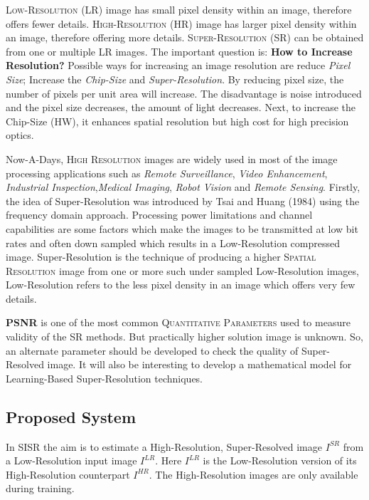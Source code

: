 \documentclass[12pt]{article}
\begin{document}
				\textsc{Low-Resolution} (LR) image has small pixel density within an image, therefore offers fewer details. \textsc{High-Resolution} (HR) image has larger pixel density within an image, therefore offering more details. \textsc{Super-Resolution} (SR) can be obtained from one or multiple LR images. The important question is: \textbf{How to Increase Resolution?} Possible ways for increasing an image resolution are reduce \textit{Pixel Size}; Increase the \textit{Chip-Size} and \textit{Super-Resolution}. By reducing pixel size, the number of pixels per unit area will increase. The disadvantage is noise introduced and the pixel size decreases, the amount of light decreases. Next, to increase the Chip-Size (HW), it enhances spatial resolution but high cost for high precision optics.
				
				Now-A-Days, \textsc{High Resolution} images are widely used in most of the image processing applications such as \textit{Remote Surveillance}, \textit{Video Enhancement}, \textit{Industrial Inspection},\textit{Medical Imaging}, \textit{Robot Vision} and \textit{Remote Sensing}. Firstly, the idea of Super-Resolution was introduced by Tsai and Huang (1984) using the frequency domain approach. Processing power limitations and channel capabilities are some factors which make the images to be transmitted at low bit rates and often down sampled which results in a Low-Resolution compressed image. Super-Resolution is the technique of producing a higher \textsc{Spatial Resolution} image from one or more such under sampled Low-Resolution images, Low-Resolution refers to the less pixel density in an image which offers very few details.
				
				\textbf{PSNR} is one of the most common \textsc{Quantitative Parameters} used to measure validity of the SR methods. But practically higher solution image is unknown. So, an alternate parameter should be developed to check the quality of Super-Resolved image. It will also be interesting to develop a mathematical model for Learning-Based Super-Resolution techniques.
		\subsection{Proposed System}
			In SISR the aim is to estimate a High-Resolution, Super-Resolved image $I^{SR}$ from a Low-Resolution input image $I^{LR}$. Here $I^{LR}$ is the Low-Resolution version of its High-Resolution counterpart $I^{HR}$. The High-Resolution images are only available during training.
			
\end{document}
